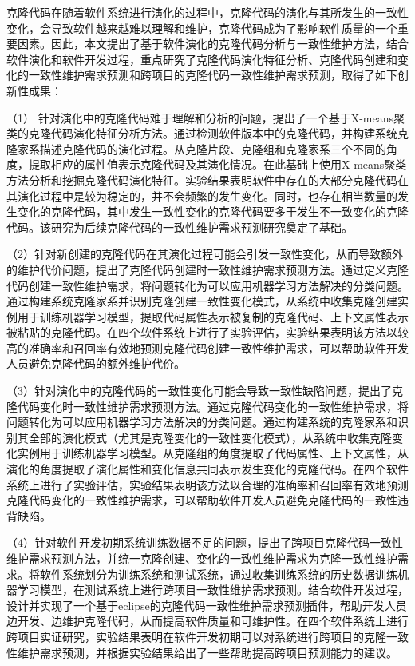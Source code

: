 

克隆代码在随着软件系统进行演化的过程中，克隆代码的演化与其所发生的一致性变化，会导致软件越来越难以理解和维护，克隆代码成为了影响软件质量的一个重要因素。因此，本文提出了基于软件演化的克隆代码分析与一致性维护方法，结合软件演化和软件开发过程，重点研究了克隆代码演化特征分析、克隆代码创建和变化的一致性维护需求预测和跨项目的克隆代码一致性维护需求预测，取得了如下创新性成果：

（1） 针对演化中的克隆代码难于理解和分析的问题，提出了一个基于X-means聚类的克隆代码演化特征分析方法。通过检测软件版本中的克隆代码，并构建系统克隆家系描述克隆代码的演化过程。从克隆片段、克隆组和克隆家系三个不同的角度，提取相应的属性值表示克隆代码及其演化情况。在此基础上使用X-means聚类方法分析和挖掘克隆代码演化特征。实验结果表明软件中存在的大部分克隆代码在其演化过程中是较为稳定的，并不会频繁的发生变化。同时，也存在相当数量的发生变化的克隆代码，其中发生一致性变化的克隆代码要多于发生不一致变化的克隆代码。该研究为后续克隆代码的一致性维护需求预测研究奠定了基础。

（2）针对新创建的克隆代码在其演化过程可能会引发一致性变化，从而导致额外的维护代价问题，提出了克隆代码创建时一致性维护需求预测方法。通过定义克隆代码创建一致性维护需求，将问题转化为可以应用机器学习方法解决的分类问题。通过构建系统克隆家系并识别克隆创建一致性变化模式，从系统中收集克隆创建实例用于训练机器学习模型，提取代码属性表示被复制的克隆代码、上下文属性表示被粘贴的克隆代码。在四个软件系统上进行了实验评估，实验结果表明该方法以较高的准确率和召回率有效地预测克隆代码创建一致性维护需求，可以帮助软件开发人员避免克隆代码的额外维护代价。

（3）针对演化中的克隆代码的一致性变化可能会导致一致性缺陷问题，提出了克隆代码变化时一致性维护需求预测方法。通过克隆代码变化的一致性维护需求，将问题转化为可以应用机器学习方法解决的分类问题。通过构建系统的克隆家系和识别其全部的演化模式（尤其是克隆变化的一致性变化模式），从系统中收集克隆变化实例用于训练机器学习模型。从克隆组的角度提取了代码属性、上下文属性，从演化的角度提取了演化属性和变化信息共同表示发生变化的克隆代码。在四个软件系统上进行了实验评估，实验结果表明该方法以合理的准确率和召回率有效地预测克隆代码变化的一致性维护需求，可以帮助软件开发人员避免克隆代码的一致性违背缺陷。

（4）针对软件开发初期系统训练数据不足的问题，提出了跨项目克隆代码一致性维护需求预测方法，并统一克隆创建、变化的一致性维护需求为克隆一致性维护需求。将软件系统划分为训练系统和测试系统，通过收集训练系统的历史数据训练机器学习模型，在测试系统上进行跨项目一致性维护需求预测。结合软件开发过程，设计并实现了一个基于eclipse的克隆代码一致性维护需求预测插件，帮助开发人员边开发、边维护克隆代码，从而提高软件质量和可维护性。在四个软件系统上进行跨项目实证研究，实验结果表明在软件开发初期可以对系统进行跨项目的克隆一致性维护需求预测，并根据实验结果给出了一些帮助提高跨项目预测能力的建议。

